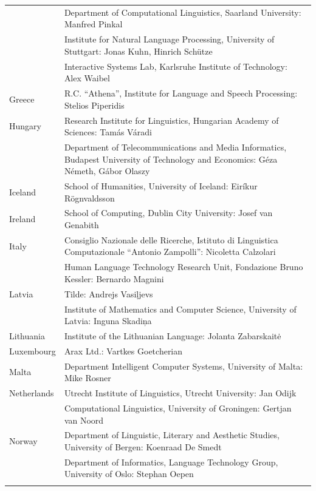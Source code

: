 \begin{longtable}{@{}lp{137mm}@{}}
& Department of Computational Linguistics, Saarland University: Manfred Pinkal\\ \addlinespace
& Institute for Natural Language Processing, University of Stuttgart: Jonas Kuhn, Hinrich Schütze\\ \addlinespace
& Interactive Systems Lab, Karlsruhe Institute of Technology: Alex Waibel\\ \addlinespace 
Greece & R.C. “Athena”, Institute for Language and Speech Processing: Stelios Piperidis\\ \addlinespace
Hungary & Research Institute for Linguistics, Hungarian Academy of Sciences: Tamás Váradi\\  \addlinespace
& Department of Telecommunications and Media Informatics, Budapest University of Technology and Economics: Géza Németh, Gábor Olaszy\\ \addlinespace
Iceland & School of Humanities, University of Iceland: Eiríkur Rögnvaldsson\\ \addlinespace
Ireland & School of Computing, Dublin City University: Josef van Genabith\\ \addlinespace
Italy & Consiglio Nazionale delle Ricerche, Istituto di Linguistica Computazionale “Antonio Zampolli”: \newline Nicoletta Calzolari\\ \addlinespace
& Human Language Technology Research Unit, Fondazione Bruno Kessler:  Bernardo Magnini\\ \addlinespace 
Latvia & Tilde: Andrejs Vasiļjevs\\ \addlinespace  
& Institute of Mathematics and Computer Science, University of Latvia: Inguna Skadiņa\\ \addlinespace
Lithuania & Institute of the Lithuanian Language: Jolanta Zabarskaitė\\ \addlinespace
Luxembourg & Arax Ltd.: Vartkes Goetcherian\\ \addlinespace
Malta & Department Intelligent Computer Systems, University of Malta: Mike Rosner\\ \addlinespace
Netherlands & Utrecht Institute of Linguistics, Utrecht University: Jan Odijk\\ \addlinespace  
& Computational Linguistics, University of Groningen: Gertjan van Noord\\ \addlinespace
Norway & Department of Linguistic, Literary and Aesthetic Studies, University of Bergen: Koenraad De Smedt\\ \addlinespace  
& Department of Informatics, Language Technology Group, University of Oslo:  Stephan Oepen \\ \addlinespace

\end{longtable}
